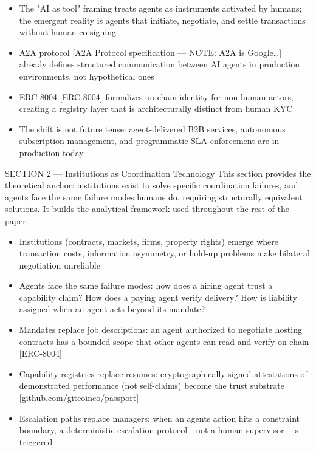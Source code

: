 \documentclass[
]{article}
\providecommand{\tightlist}{%
  \setlength{\itemsep}{0pt}\setlength{\parskip}{0pt}}
\begin{document}
\begin{itemize}
\tightlist
\item
  The "AI as tool" framing treats agents as instruments activated by
  humans; the emergent reality is agents that initiate, negotiate, and
  settle transactions without human co-signing
\item
  A2A protocol {[}A2A Protocol specification --- NOTE: A2A is
  Google\ldots{]} already defines structured communication between AI
  agents in production environments, not hypothetical ones
\item
  ERC-8004 {[}ERC-8004{]} formalizes on-chain identity for non-human
  actors, creating a registry layer that is architecturally distinct
  from human KYC
\item
  The shift is not future tense: agent-delivered B2B services,
  autonomous subscription management, and programmatic SLA enforcement
  are in production today
\end{itemize}

SECTION 2 --- Institutions as Coordination Technology This section
provides the theoretical anchor: institutions exist to solve specific
coordination failures, and agents face the same failure modes humans do,
requiring structurally equivalent solutions. It builds the analytical
framework used throughout the rest of the paper.

\begin{itemize}
\tightlist
\item
  Institutions (contracts, markets, firms, property rights) emerge where
  transaction costs, information asymmetry, or hold-up problems make
  bilateral negotiation unreliable
\item
  Agents face the same failure modes: how does a hiring agent trust a
  capability claim? How does a paying agent verify delivery? How is
  liability assigned when an agent acts beyond its mandate?
\item
  Mandates replace job descriptions: an agent authorized to negotiate
  hosting contracts has a bounded scope that other agents can read and
  verify on-chain {[}ERC-8004{]}
\item
  Capability registries replace resumes: cryptographically signed
  attestations of demonstrated performance (not self-claims) become the
  trust substrate {[}github.com/gitcoinco/passport{]}
\item
  Escalation paths replace managers: when an agent\textquotesingle s
  action hits a constraint boundary, a deterministic escalation
  protocol---not a human supervisor---is triggered
\end{itemize}
\end{document}
